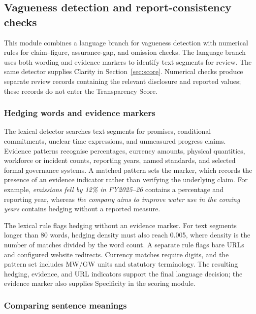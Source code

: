 \subsection{Vagueness detection and report-consistency checks}
\label{sec:detector}

This module combines a language branch for vagueness detection with numerical rules for claim--figure, assurance-gap, and omission checks. The language branch uses both wording and evidence markers to identify text segments for review. The same detector supplies Clarity in Section~\ref{sec:score}. Numerical checks produce separate review records containing the relevant disclosure and reported values; these records do not enter the Transparency Score.

\subsubsection{Hedging words and evidence markers}

The lexical detector searches text segments for promises, conditional commitments, unclear time expressions, and unmeasured progress claims. Evidence patterns recognise percentages, currency amounts, physical quantities, workforce or incident counts, reporting years, named standards, and selected formal governance systems. A matched pattern sets the  marker, which records the presence of an evidence indicator rather than verifying the underlying claim. For example, \emph{emissions fell by 12\% in FY2025--26} contains a percentage and reporting year, whereas \emph{the company aims to improve water use in the coming years} contains hedging without a reported measure.

The lexical rule flags hedging without an evidence marker. For text segments longer than 80 words, hedging density must also reach 0.005, where density is the number of matches divided by the word count. A separate rule flags bare URLs and configured website redirects. Currency matches require digits, and the pattern set includes MW/GW units and statutory terminology. The resulting hedging, evidence, and URL indicators support the final language decision; the evidence marker also supplies Specificity in the scoring module.

\subsubsection{Comparing sentence meanings}

